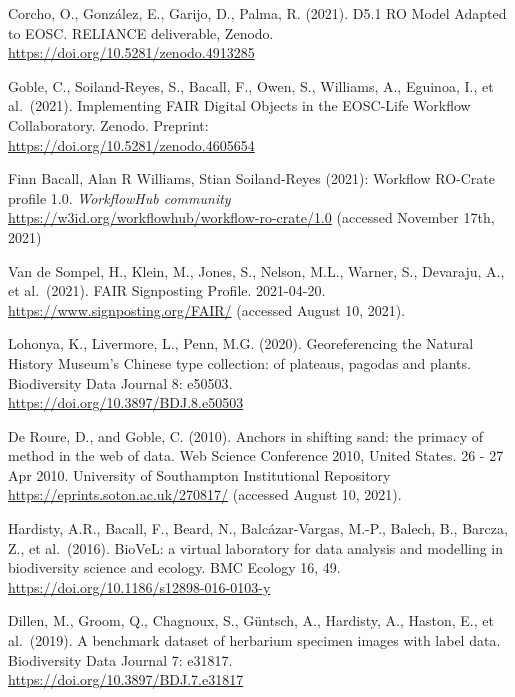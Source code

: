 \begin{thebibliography}{9}
Corcho, O., González, E., Garijo, D., Palma, R. (2021). D5.1 RO
Model Adapted to EOSC. RELIANCE deliverable, Zenodo.\\
\url{https://doi.org/10.5281/zenodo.4913285}

Goble, C., Soiland-Reyes, S., Bacall, F., Owen, S., Williams,
A., Eguinoa, I., et al.~(2021). Implementing FAIR Digital Objects in the
EOSC-Life Workflow Collaboratory. Zenodo. Preprint:\\
\url{https://doi.org/10.5281/zenodo.4605654}

Finn Bacall, Alan R Williams, Stian Soiland-Reyes (2021):
Workflow RO-Crate profile 1.0. \emph{WorkflowHub community}\\
\url{https://w3id.org/workflowhub/workflow-ro-crate/1.0} (accessed
November 17th, 2021)

Van de Sompel, H., Klein, M., Jones, S., Nelson, M.L., Warner,
S., Devaraju, A., et al.~(2021). FAIR Signposting Profile. 2021-04-20.\\
\url{https://www.signposting.org/FAIR/} (accessed August 10, 2021).

Lohonya, K., Livermore, L., Penn, M.G. (2020). Georeferencing
the Natural History Museum's Chinese type collection: of plateaus,
pagodas and plants. Biodiversity Data Journal 8: e50503.\\
\url{https://doi.org/10.3897/BDJ.8.e50503}

De Roure, D., and Goble, C. (2010). Anchors in shifting sand:
the primacy of method in the web of data. Web Science Conference 2010,
United States. 26 - 27 Apr 2010. University of Southampton Institutional
Repository\\
\url{https://eprints.soton.ac.uk/270817/} (accessed August 10, 2021).

Hardisty, A.R., Bacall, F., Beard, N., Balcázar-Vargas, M.-P.,
Balech, B., Barcza, Z., et al.~(2016). BioVeL: a virtual laboratory for
data analysis and modelling in biodiversity science and ecology. BMC
Ecology 16, 49.\\
\url{https://doi.org/10.1186/s12898-016-0103-y}

Dillen, M., Groom, Q., Chagnoux, S., Güntsch, A., Hardisty, A.,
Haston, E., et al.~(2019). A benchmark dataset of herbarium specimen
images with label data. Biodiversity Data Journal 7: e31817.\\
\url{https://doi.org/10.3897/BDJ.7.e31817}


\end{thebibliography}
